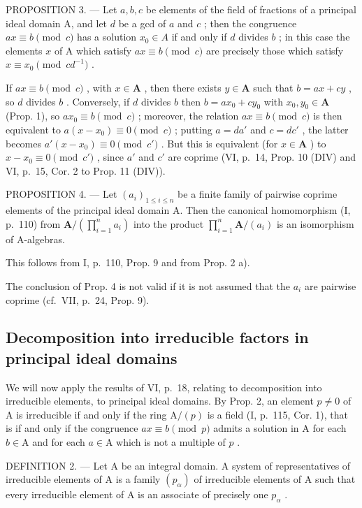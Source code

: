 PROPOSITION 3. --- Let \(a, b, c\) be elements of the field of fractions of a principal ideal domain A, and let \(d\) be a gcd of \(a\) and \(c\) ; then the congruence \(ax \equiv b \pmod{c}\) has a solution \(x_0 \in A\) if and only if \(d\) divides \(b\) ; in this case the elements \(x\) of A which satisfy \(ax \equiv b \pmod{c}\) are precisely those which satisfy \(x \equiv x_0 \pmod{cd^{-1}}\) .

If \(ax \equiv b \pmod{c}\) , with \(x \in \mathbf{A}\) , then there exists \(y \in \mathbf{A}\) such that \(b = ax + cy\) , so \(d\) divides \(b\) . Conversely, if \(d\) divides \(b\) then \(b = ax_0 + cy_0\) with \(x_0, y_0 \in \mathbf{A}\) (Prop. 1), so \(ax_0 \equiv b \pmod{c}\) ; moreover, the relation \(ax \equiv b \pmod{c}\) is then equivalent to \(a(x - x_0) \equiv 0 \pmod{c}\) ; putting \(a = da'\) and \(c = dc'\) , the latter becomes \(a'(x - x_0) \equiv 0 \pmod{c'}\) . But this is equivalent (for \(x \in \mathbf{A}\) ) to \(x - x_0 \equiv 0 \pmod{c'}\) , since \(a'\) and \(c'\) are coprime (VI, p.~14, Prop. 10 (DIV) and VI, p.~15, Cor. 2 to Prop. 11 (DIV)).

PROPOSITION 4. --- Let \((a_i)_{1 \leq i \leq n}\) be a finite family of pairwise coprime elements of the principal ideal domain A. Then the canonical homomorphism (I, p.~110) from \(\mathbf{A}/\left(\prod_{i=1}^{n} a_i\right)\) into the product \(\prod_{i=1}^{n} \mathbf{A}/(a_i)\) is an isomorphism of A-algebras.

This follows from I, p.~110, Prop. 9 and from Prop. 2 a).

The conclusion of Prop. 4 is not valid if it is not assumed that the \(a_{i}\) are pairwise coprime (cf.~VII, p.~24, Prop. 9).

\subsection{Decomposition into irreducible factors in principal ideal domains}

We will now apply the results of VI, p.~18, relating to decomposition into irreducible elements, to principal ideal domains. By Prop. 2, an element \(p \neq 0\) of A is irreducible if and only if the ring \(\mathrm{A}/(p)\) is a field (I, p.~115, Cor. 1), that is if and only if the congruence \(ax \equiv b \pmod{p}\) admits a solution in A for each \(b \in \mathrm{A}\) and for each \(a \in \mathrm{A}\) which is not a multiple of \(p\) .

DEFINITION 2. --- Let A be an integral domain. A system of representatives of irreducible elements of A is a family \((p_{\alpha})\) of irreducible elements of A such that every irreducible element of A is an associate of precisely one \(p_{\alpha}\) .

